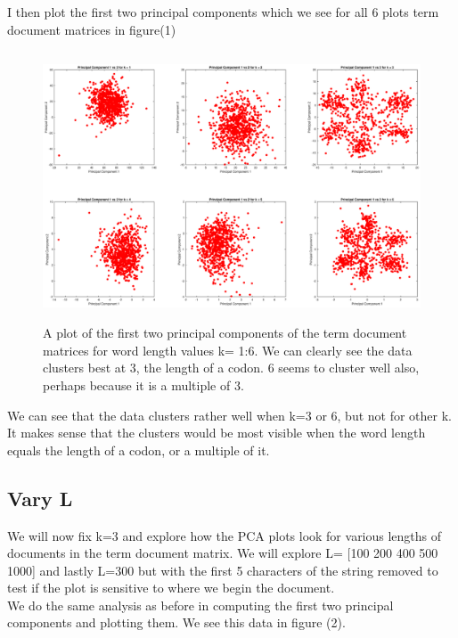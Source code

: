 \documentclass{article}
\begin{document}
I then plot the first two principal components which we see for all 6 plots term document matrices in figure(1)

\begin{figure}[H]
    \centerline
    {
    \includegraphics[width=17.5cm, height=8cm]{c_k_vary}
    }
    \caption{\label{fig:my figure} A plot of the first two principal components of the term document matrices for word length values k= 1:6.  We can clearly see the data clusters best at 3, the length of a codon. 6 seems to cluster well also, perhaps because it is a multiple of 3.}
\end{figure}

We can see that the data clusters rather well when k=3 or 6, but not for other k.  It makes sense that the clusters would be most visible when the word length equals the length of a codon, or a multiple of it.

\subsection*{Vary L}
We will now fix k=3 and explore how the PCA plots look for various lengths of documents in the term document matrix.  We will explore L= [100 200 400 500 1000] and lastly L=300 but with the first 5 characters of the string removed to test if the plot is sensitive to where we begin the document. 
\\We do the same analysis as before in computing the first two principal components and plotting them.  We see this data in figure (2).  
\end{document}
